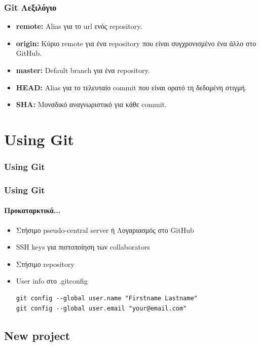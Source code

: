 \documentclass[]{beamer}
\begin{document}
\begin{frame}
  \frametitle{Git Λεξιλόγιο}
  \begin{itemize}
  \item \textbf{remote:} Alias για το url ενός repository.
  \item \textbf{origin:} Κύριο remote για ένα repository που είναι συγχρονισμένο
    ένα άλλο στο GitHub.
  \item \textbf{master:} Default branch για ένα repository.
  \item \textbf{HEAD:} Alias για το τελευταίο commit που είναι ορατό τη δεδομένη
    στιγμή. 
  \item \textbf{SHA:} Μοναδικό αναγνωριστικό για κάθε commit.
  \end{itemize}
\end{frame}

\section{Using Git}

\begin{frame}
  \frametitle{Using Git}
\end{frame}

\begin{frame}[fragile]
  \frametitle{Using Git}
  \framesubtitle{Προκαταρκτικά...}
  \begin{itemize}
    \item Στήσιμο pseudo-central server ή Λογαριασμός στο GitHub
    \item SSH keys για πιστοποίηση των collaborators
    \item Στήσιμο repository
    \item User info στο .gitconfig
\begin{verbatim}
git config --global user.name "Firstname Lastname"
git config --global user.email "your@email.com"
\end{verbatim}
  \end{itemize}
\end{frame}

\subsection{New project}
\end{document}
